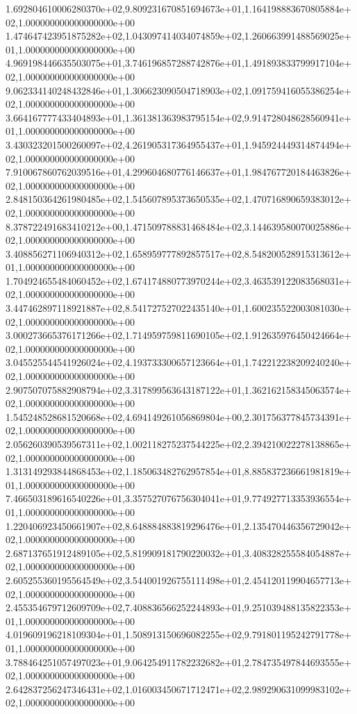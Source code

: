 1.692804610006280370e+02,9.809231670851694673e+01,1.164198883670805884e+02,1.000000000000000000e+00
1.474647423951875282e+02,1.043097414034074859e+02,1.260663991488569025e+01,1.000000000000000000e+00
4.969198446635503075e+01,3.746196857288742876e+01,1.491893833799917104e+02,1.000000000000000000e+00
9.062334140248432846e+01,1.306623090504718903e+02,1.091759416055386254e+02,1.000000000000000000e+00
3.664167777433404893e+01,1.361381363983795154e+02,9.914728048628560941e+01,1.000000000000000000e+00
3.430323201500260097e+02,4.261905317364955437e+01,1.945924449314874494e+02,1.000000000000000000e+00
7.910067860762039516e+01,4.299604680776146637e+01,1.984767720184463826e+02,1.000000000000000000e+00
2.848150364261980485e+02,1.545607895373650535e+02,1.470716890659383012e+02,1.000000000000000000e+00
8.378722491683410212e+00,1.471509788831468484e+02,3.144639580070025886e+02,1.000000000000000000e+00
3.408856271106940312e+02,1.658959777892857517e+02,8.548200528915313612e+01,1.000000000000000000e+00
1.704924655484060452e+02,1.674174880773970244e+02,3.463539122083568031e+02,1.000000000000000000e+00
3.447462897118921887e+02,8.541727527022435140e+01,1.600235522003081030e+02,1.000000000000000000e+00
3.000273665376171266e+02,1.714959759811690105e+02,1.912635976450424664e+02,1.000000000000000000e+00
3.045525544541926024e+02,4.193733300657123664e+01,1.742212238209240240e+02,1.000000000000000000e+00
2.907507075882908794e+02,3.317899563643187122e+01,1.362162158345063574e+02,1.000000000000000000e+00
1.545248528681520668e+02,4.694149261056869804e+00,2.301756377845734391e+02,1.000000000000000000e+00
2.056260390539567311e+02,1.002118275237544225e+02,2.394210022278138865e+02,1.000000000000000000e+00
1.313149293844868453e+02,1.185063482762957854e+01,8.885837236661981819e+01,1.000000000000000000e+00
7.466503189616540226e+01,3.357527076756304041e+01,9.774927713353936554e+01,1.000000000000000000e+00
1.220406923450661907e+02,8.648884883819296476e+01,2.135470446356729042e+02,1.000000000000000000e+00
2.687137651912489105e+02,5.819909181790220032e+01,3.408328255584054887e+02,1.000000000000000000e+00
2.605255360195564549e+02,3.544001926755111498e+01,2.454120119904657713e+02,1.000000000000000000e+00
2.455354679712609709e+02,7.408836566252244893e+01,9.251039488135822353e+01,1.000000000000000000e+00
4.019609196218109304e+01,1.508913150696082255e+02,9.791801195242791778e+01,1.000000000000000000e+00
3.788464251057497023e+01,9.064254911782232682e+01,2.784735497844693555e+02,1.000000000000000000e+00
2.642837256247346431e+02,1.016003450671712471e+02,2.989290631099983102e+02,1.000000000000000000e+00
